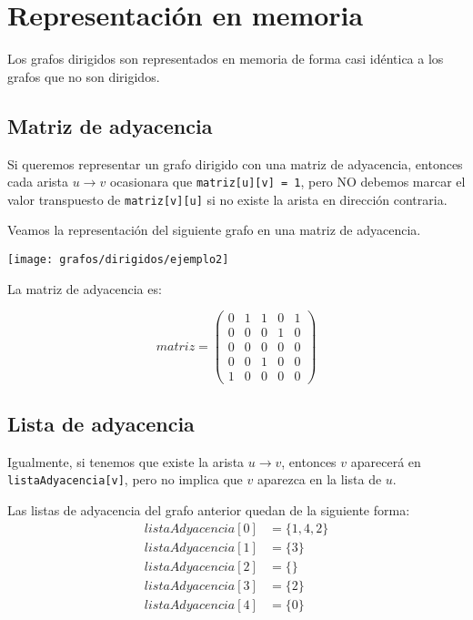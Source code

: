 \begin{exercise}
\end{exercise}

\section{Representación en memoria}
Los grafos dirigidos son representados en memoria de forma casi idéntica a los grafos que no son dirigidos. 

\subsection*{Matriz de adyacencia}
Si queremos representar un grafo dirigido con una matriz de adyacencia, entonces cada arista \(u \rightarrow v\) ocasionara que \verb|matriz[u][v] = 1|, pero NO debemos marcar el valor transpuesto de \verb|matriz[v][u]| si no existe la arista en dirección contraria.

Veamos la representación del siguiente grafo en una matriz de adyacencia.
\begin{center}
	\texttt{[image: grafos/dirigidos/ejemplo2]}
\end{center}

La matriz de adyacencia es:
\begin{large}
	\begin{displaymath}	
		matriz = \begin{pmatrix}
			0 & 1 & 1 & 0 & 1\\
			0 & 0 & 0 & 1 & 0\\
			0 & 0 & 0 & 0 & 0\\
			0 & 0 & 1 & 0 & 0\\
			1 & 0 & 0 & 0 & 0
		\end{pmatrix}
	\end{displaymath}
\end{large}


\subsection*{Lista de adyacencia}
Igualmente, si tenemos que existe la arista \(u \rightarrow v\), entonces \(v\) aparecerá en \verb|listaAdyacencia[v]|, pero no implica que \(v\) aparezca en la lista de \(u\).

Las listas de adyacencia del grafo anterior quedan de la siguiente forma:
{
\begin{align*}
listaAdyacencia[0] & =\{1,4,2\} \\
listaAdyacencia[1] & =\{3\}\\
listaAdyacencia[2] & =\{\}\\
listaAdyacencia[3] & =\{2\}\\
listaAdyacencia[4] & =\{0\}
\end{align*}
}

